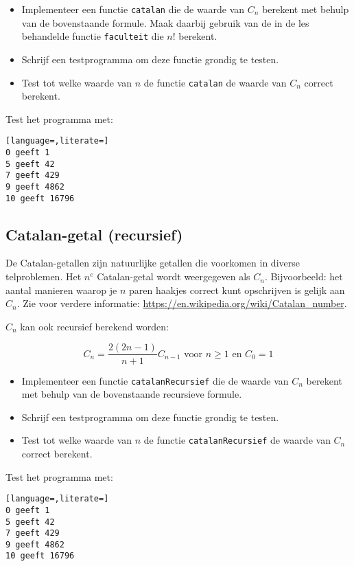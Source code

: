 \documentclass[a4paper,10pt,fleqn,twoside]{article}
\begin{document}
\begin{itemize}
\item Implementeer een functie \lstinline|catalan| die de waarde van $C_n$ berekent met behulp van de bovenstaande formule. Maak daarbij gebruik van de in de les behandelde functie \lstinline|faculteit| die $n!$ berekent.
\item Schrijf een testprogramma om deze functie grondig te testen.
\item Test tot welke waarde van $n$ de functie \lstinline|catalan| de waarde van $C_n$ correct berekent.
\end{itemize}

Test het programma met:

\begin{lstlisting}[language=,literate=]
0 geeft 1
5 geeft 42
7 geeft 429
9 geeft 4862
10 geeft 16796
\end{lstlisting}

\subsection{Catalan-getal (recursief)}
De Catalan-getallen zijn natuurlijke getallen die voorkomen in diverse telproblemen. Het $n^e$ Catalan-getal wordt weergegeven als $C_n$. Bijvoorbeeld: het aantal manieren waarop je $n$ paren haakjes correct kunt opschrijven is gelijk aan $C_n$. Zie voor verdere informatie: \url{https://en.wikipedia.org/wiki/Catalan_number}.

$C_n$ kan ook recursief berekend worden:

\begin{equation*}
C_n = \dfrac{2(2n-1)}{n+1}C_{n-1} \text{ voor } n \geq 1 \text{ en } C_0=1
\end{equation*}

\begin{itemize}
\item Implementeer een functie \lstinline|catalanRecursief| die de waarde van $C_n$ berekent met behulp van de bovenstaande recursieve formule.
\item Schrijf een testprogramma om deze functie grondig te testen.
\item Test tot welke waarde van $n$ de functie \lstinline|catalanRecursief| de waarde van $C_n$ correct berekent.
\end{itemize}

Test het programma met:

\begin{lstlisting}[language=,literate=]
0 geeft 1
5 geeft 42
7 geeft 429
9 geeft 4862
10 geeft 16796
\end{lstlisting}
\end{document}
